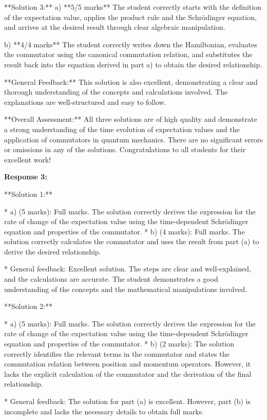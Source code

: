 \documentclass[a4paper,11pt]{article}
\begin{document}
**Solution 3:**
a) **5/5 marks**
The student correctly starts with the definition of the expectation value, applies the product rule and the Schrödinger equation, and arrives at the desired result through clear algebraic manipulation.

b) **4/4 marks**
The student correctly writes down the Hamiltonian, evaluates the commutator using the canonical commutation relation, and substitutes the result back into the equation derived in part a) to obtain the desired relationship.

**General Feedback:** This solution is also excellent, demonstrating a clear and thorough understanding of the concepts and calculations involved. The explanations are well-structured and easy to follow.

**Overall Assessment:** All three solutions are of high quality and demonstrate a strong understanding of the time evolution of expectation values and the application of commutators in quantum mechanics. There are no significant errors or omissions in any of the solutions. Congratulations to all students for their excellent work!

\textbf{Response 3:}

**Solution 1:**

* a) (5 marks): Full marks. The solution correctly derives the expression for the rate of change of the expectation value using the time-dependent Schrödinger equation and properties of the commutator.
* b) (4 marks): Full marks. The solution correctly calculates the commutator and uses the result from part (a) to derive the desired relationship.

* General feedback: Excellent solution. The steps are clear and well-explained, and the calculations are accurate. The student demonstrates a good understanding of the concepts and the mathematical manipulations involved.

**Solution 2:**

* a) (5 marks): Full marks. The solution correctly derives the expression for the rate of change of the expectation value using the time-dependent Schrödinger equation and properties of the commutator.
* b) (2 marks): The solution correctly identifies the relevant terms in the commutator and states the commutation relation between position and momentum operators. However, it lacks the explicit calculation of the commutator and the derivation of the final relationship.

* General feedback: The solution for part (a) is excellent. However, part (b) is incomplete and lacks the necessary details to obtain full marks.
\end{document}
